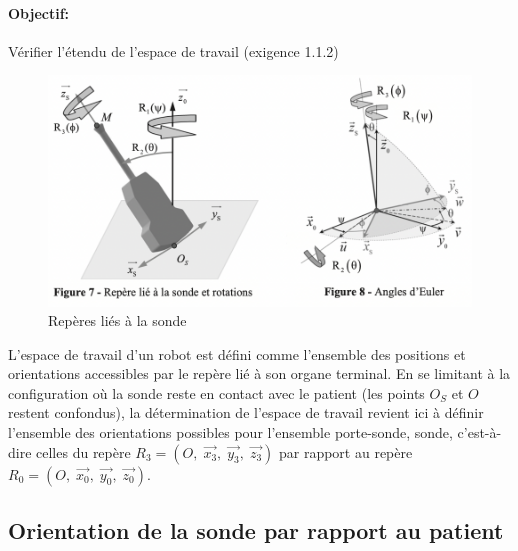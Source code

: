\paragraph{Objectif:} Vérifier l'étendu de l'espace de travail (exigence 1.1.2)

\begin{figure}[ht!]
\begin{center}
 \includegraphics[width=0.9\linewidth]{img/fig07}
\end{center}
\caption{Repères liés à la sonde}
\label{fig07}
\end{figure}

L'espace de travail d'un robot est défini comme l'ensemble des positions et orientations accessibles par le repère lié à son organe terminal. En se limitant à la configuration où la sonde reste en contact avec le patient (les points $O_S$ et $O$ restent confondus), la détermination de l'espace de travail revient ici à définir l'ensemble des orientations possibles pour l'ensemble {porte-sonde, sonde}, c'est-à-dire celles du repère $R_3=(O,\;\overrightarrow{x_3},\;\overrightarrow{y_3},\;\overrightarrow{z_3})$ par rapport au repère  $R_0=(O,\;\overrightarrow{x_0},\;\overrightarrow{y_0},\;\overrightarrow{z_0})$.

\subsection{Orientation de la sonde par rapport au patient}

